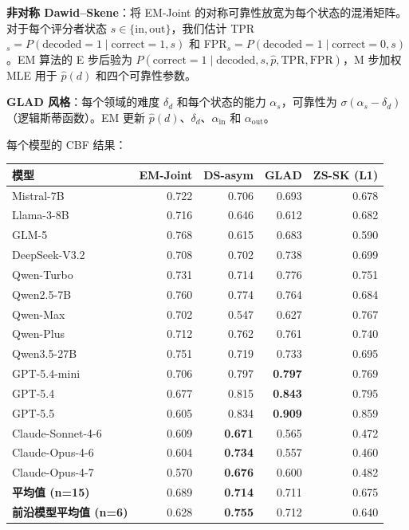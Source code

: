 \documentclass[11pt,a4paper,fontset=fandol]{ctexart}
\begin{document}
\textbf{非对称 Dawid--Skene}：将 EM-Joint 的对称可靠性放宽为每个状态的混淆矩阵。对于每个评分者状态 $s \in \{\text{in},\text{out}\}$，我们估计 TPR$_s = P(\text{decoded}=1 \mid \text{correct}=1, s)$ 和 FPR$_s = P(\text{decoded}=1 \mid \text{correct}=0, s)$。EM 算法的 E 步后验为 $P(\text{correct}=1 \mid \text{decoded}, s, \hat p, \text{TPR}, \text{FPR})$，M 步加权 MLE 用于 $\hat p(d)$ 和四个可靠性参数。

\textbf{GLAD 风格}：每个领域的难度 $\delta_d$ 和每个状态的能力 $\alpha_s$，可靠性为 $\sigma(\alpha_s - \delta_d)$（逻辑斯蒂函数）。EM 更新 $\hat p(d)$、$\delta_d$、$\alpha_{\text{in}}$ 和 $\alpha_{\text{out}}$。

每个模型的 CBF 结果：
\begin{center}
\small
\begin{tabular}{l rrrr}
\toprule
\textbf{模型} & \textbf{EM-Joint} & \textbf{DS-asym} & \textbf{GLAD} & \textbf{ZS-SK (L1)} \\
\midrule
Mistral-7B          & 0.722 & 0.706 & 0.693 & 0.678 \\
Llama-3-8B          & 0.716 & 0.646 & 0.612 & 0.682 \\
GLM-5               & 0.768 & 0.615 & 0.683 & 0.590 \\
DeepSeek-V3.2       & 0.708 & 0.702 & 0.738 & 0.699 \\
Qwen-Turbo          & 0.731 & 0.714 & 0.776 & 0.751 \\
Qwen2.5-7B          & 0.760 & 0.774 & 0.764 & 0.684 \\
Qwen-Max            & 0.702 & 0.547 & 0.627 & 0.767 \\
Qwen-Plus           & 0.712 & 0.762 & 0.761 & 0.740 \\
Qwen3.5-27B         & 0.751 & 0.719 & 0.733 & 0.695 \\
\midrule
GPT-5.4-mini        & 0.706 & 0.797 & \textbf{0.797} & 0.769 \\
GPT-5.4             & 0.677 & 0.815 & \textbf{0.843} & 0.795 \\
GPT-5.5             & 0.605 & 0.834 & \textbf{0.909} & 0.859 \\
Claude-Sonnet-4-6   & 0.609 & \textbf{0.671} & 0.565 & 0.472 \\
Claude-Opus-4-6     & 0.604 & \textbf{0.734} & 0.557 & 0.460 \\
Claude-Opus-4-7     & 0.570 & \textbf{0.676} & 0.600 & 0.482 \\
\midrule
\textbf{平均值 (n=15)} & 0.689 & \textbf{0.714} & 0.711 & 0.675 \\
\textbf{前沿模型平均值 (n=6)} & 0.628 & \textbf{0.755} & 0.712 & 0.640 \\
\bottomrule
\end{tabular}
\end{center}
\end{document}
